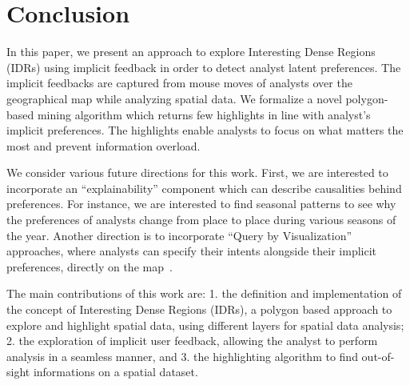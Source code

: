 \documentclass[sigconf,edbt]{acmart-edbt2019}
\begin{document}
\section{Conclusion}
\label{sec:conclusion}

In this paper, we present an approach to explore Interesting Dense Regions (IDRs) using implicit feedback in order to detect analyst latent preferences. The implicit feedbacks are captured from mouse moves of analysts over the geographical map while analyzing spatial data. We formalize a novel polygon-based mining algorithm which returns few highlights in line with analyst's implicit preferences. The highlights enable analysts to focus on what matters the most and prevent information overload.

\vspace{2pt}
We consider various future directions for this work. First, we are interested to incorporate an ``explainability'' component which can describe causalities behind preferences. For instance, we are interested to find seasonal patterns to see why the preferences of analysts change from place to place during various seasons of the year. Another direction is to incorporate ``Query by Visualization'' approaches, where analysts can specify their intents alongside their implicit preferences, directly on the map~\cite{siddiqui2016effortless}.

The main contributions of this work are: 1. the definition and implementation of the concept of Interesting Dense Regions (IDRs), a polygon based approach to explore and highlight spatial data, using different layers for spatial data analysis; 2. the exploration of implicit user feedback, allowing the analyst to perform analysis in a seamless manner, and 3. the highlighting algorithm to find out-of-sight informations on a spatial dataset. 


 
\end{document}
